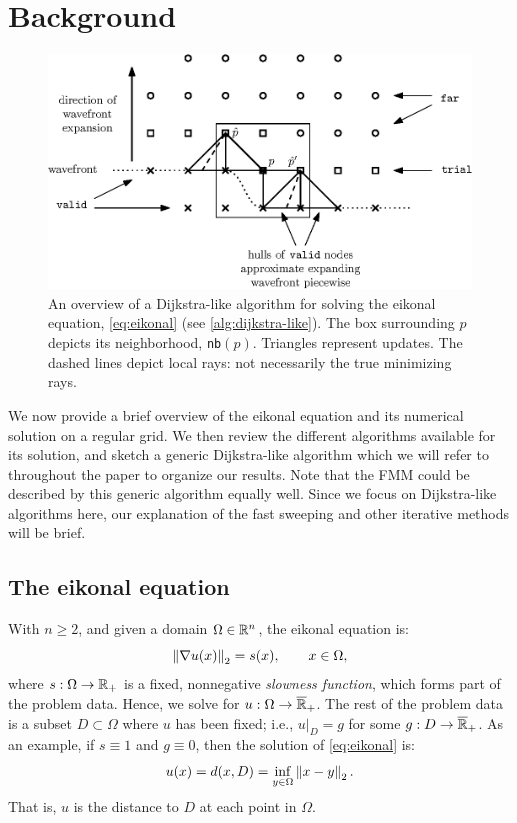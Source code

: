 \documentclass[eikonal.tex]{subfiles}
\begin{document}
\section{Background}\label{sec:background}

\begin{figure}[t]
  \centering
  \includegraphics{overview.eps}
  \caption{An overview of a Dijkstra-like algorithm for solving the
    eikonal equation, \cref{eq:eikonal} (see
    \cref{alg:dijkstra-like}). The box surrounding $p$ depicts its
    neighborhood, \texttt{nb}$(p)$. Triangles represent updates. The
    dashed lines depict local rays: not necessarily the true
    minimizing rays.}
  \label{fig:overview}
\end{figure}

We now provide a brief overview of the eikonal equation and its
numerical solution on a regular grid. We then review the different
algorithms available for its solution, and sketch a generic
Dijkstra-like algorithm which we will refer to throughout the paper to
organize our results. Note that the FMM could be described by this
generic algorithm equally well. Since we focus on Dijkstra-like
algorithms here, our explanation of the fast sweeping and other
iterative methods will be brief.

\subsection{The eikonal equation}

With $n \geq 2$, and given a domain $\Omega \in \mathbb{R}^n$, the eikonal
equation is:
\begin{equation}\label{eq:eikonal}
  \norm{\nabla u(x)}_2 = s(x), \qquad x \in \Omega,
\end{equation}
where $s : \Omega \to \mathbb{R}_+$ is a fixed, nonnegative \emph{slowness
  function}, which forms part of the problem data. Hence, we solve for
$u : \Omega \to \overline{\mathbb{R}}_+$. The rest of the problem data is a
subset $D \subset \Omega$ where $u$ has been fixed; i.e.,
$\left. u \right|_D = g$ for some $g : D \to \overline{\mathbb{R}}_+$. As an
example, if $s \equiv 1$ and $g \equiv 0$, then the solution of
\cref{eq:eikonal} is:
\begin{equation}
  \label{eq:distance-to-Omega}
  u(x) = d(x, D) = \inf_{y \in \Omega} \norm{x - y}_2.
\end{equation}
That is, $u$ is the distance to $D$ at each point in
$\Omega$. 
\end{document}
